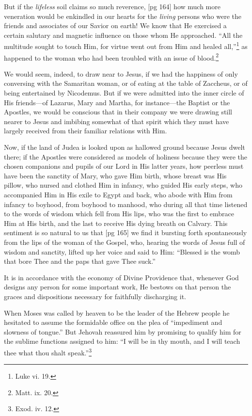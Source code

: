 But if the \emph{lifeless} soil claims so much reverence,
[pg 164]
how much more veneration would be enkindled in
our hearts for the \emph{living} persons who were the
friends and associates of our Savior on earth!
We know that He exercised a certain salutary and
magnetic influence on those whom He approached.
“All the multitude sought to touch Him, for virtue
went out from Him and healed all,”\footnote{Luke
vi. 19.} as happened
to the woman who had been troubled with an issue
of blood.\footnote{Matt. ix. 20.}

We would seem, indeed, to draw near to Jesus,
if we had the happiness of only conversing with
the Samaritan woman, or of eating at the table of
Zaccheus, or of being entertained by Nicodemus.
But if we were admitted into the inner circle of
His friends—of Lazarus, Mary and Martha, for
instance—the Baptist or the Apostles, we would
be conscious that in their company we were drawing
still nearer to Jesus and imbibing somewhat
of that spirit which they must have largely received
from their familiar relations with Him.

Now, if the land of Judea is looked upon as
hallowed ground because Jesus dwelt there; if
the Apostles were considered as models of holiness
because they were the chosen companions and
pupils of our Lord in His latter years, how peerless
must have been the sanctity of Mary, who
gave Him birth, whose breast was His pillow, who
nursed and clothed Him in infancy, who guided
His early steps, who accompanied Him in His
exile to Egypt and back, who abode with Him
from infancy to boyhood, from boyhood to manhood,
who during all that time listened to the
words of wisdom which fell from His lips, who
was the first to embrace Him at His birth,
and the last to receive His dying breath on Calvary.
This sentiment is so natural to us that
[pg 165]
we find it bursting forth spontaneously from the
lips of the woman of the Gospel, who, hearing the
words of Jesus full of wisdom and sanctity, lifted
up her voice and said to Him: “Blessed is the
womb that bore Thee and the paps that gave
Thee suck.”

It is in accordance with the economy of Divine
Providence that, whenever God designs any person
for some important work, He bestows on that
person the graces and dispositions necessary for
faithfully discharging it.

When Moses was called by heaven to be the
leader of the Hebrew people he hesitated to assume
the formidable office on the plea of “impediment
and slowness of tongue.” But Jehovah reassured
him by promising to qualify him for the
sublime functions assigned to him: “I will be
in thy mouth, and I will teach thee what thou
shalt speak.”\footnote{Exod. iv. 12.}

